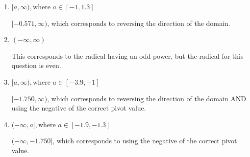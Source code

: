 \documentclass{extbook}[14pt]
\begin{document}
\begin{enumerate}
{\begin{enumerate}[label=\Alph*.]
* $(-\infty, -0.571]$, which is the correct option.
\item \( [a, \infty), \text{where } a \in [-1, 1.3] \)

 $[-0.571, \infty)$, which corresponds to reversing the direction of the domain.
\item \( (-\infty, \infty) \)

This corresponds to the radical having an odd power, but the radical for this question is even.
\item \( [a, \infty), \text{where } a \in [-3.9, -1] \)

$[-1.750, \infty)$, which corresponds to reversing the direction of the domain AND using the negative of the correct pivot value.
\item \( (-\infty, a], \text{where } a \in [-1.9, -1.3] \)

$(-\infty, -1.750]$, which corresponds to using the negative of the correct pivot value.
\end{enumerate}

}
\end{enumerate}
\end{document}
